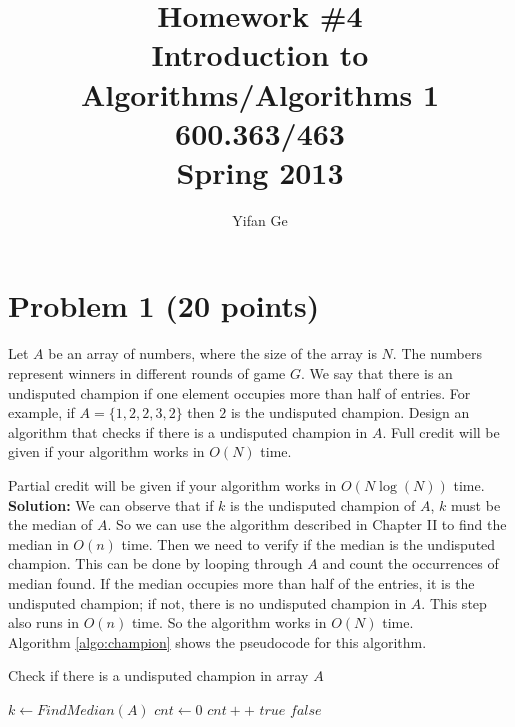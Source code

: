 \documentclass[letterpaper, 11pt]{article}
\begin{document}
\title{Homework \#4 \\ Introduction to Algorithms/Algorithms 1 \\ 600.363/463 \\Spring 2013}
\author{Yifan Ge}

\maketitle

\section{Problem 1 (20 points)} %
Let $A$ be an array of numbers, where the size of the array is $N$.
The numbers represent winners in different rounds of game $G$.
We say that there is an undisputed champion if one element occupies more than half of entries.
For example, if $A = \{1,2,2,3, 2\}$ then $2$ is the undisputed champion.
Design an algorithm that checks if there is a undisputed champion in $A$.
Full credit will be given if your algorithm works in $O(N)$ time.

Partial credit will be given if your algorithm works in $O(N\log(N))$ time.\\

\textbf{Solution:} We can observe that if $k$ is the undisputed champion of $A$, $k$ must be the median of $A$. So we can use the algorithm described in Chapter II to find the median in $O(n)$ time. Then we need to verify if the median is the undisputed champion. This can be done by looping through $A$ and count the occurrences of median found. If the median occupies more than half of the entries, it is the undisputed champion; if not, there is no undisputed champion in $A$. This step also runs in $O(n)$ time. So the algorithm works in $O(N)$ time.\\
Algorithm \ref{algo:champion} shows the pseudocode for this algorithm.
\begin{algorithm}
\label{algo:champion}
\caption{Check if there is a undisputed champion in array $A$}
\begin{algorithmic}[1]
    \STATE $k \leftarrow FindMedian(A)$ 
    \STATE $cnt \leftarrow 0$
            \STATE $cnt++$
        \ENDIF
    \ENDFOR
        \RETURN $true$
    \ELSE
        \RETURN $false$
    \ENDIF
\end{algorithmic}
\end{algorithm}
\end{document}
